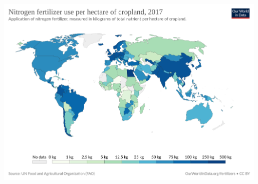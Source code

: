 \begin{frame}{}
    \includegraphics[width=0.99\textwidth]{Figures/worldindata/nitrogen-fertilizer-application-per-hectare-of-cropland.png}
\end{frame}